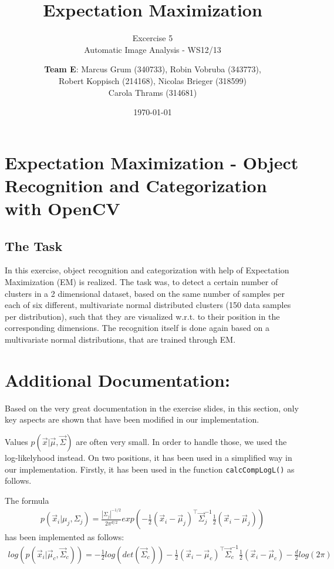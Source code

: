 \documentclass[a4paper,headings=small]{scrartcl}
\title{Expectation Maximization}
\subtitle{Excercise 5 \\ Automatic Image Analysis - WS12/13}
\author{\textbf{Team E}: Marcus Grum (340733), Robin Vobruba (343773), \\ Robert Koppisch (214168), Nicolas Brieger (318599)\\Carola Thrams (314681)}
\date{\today}
\numberwithin{equation}{section} %
\numberwithin{figure}{section}   %
\begin{document}
\maketitle

\section{Expectation Maximization - Object Recognition and Categorization with OpenCV}


\subsection{The Task}
In this exercise, object recognition and categorization
with help of Expectation Maximization (EM) is realized.
The task was, to detect a certain number of clusters in a 2 dimensional dataset,
based on the same number of samples per each of six different,
multivariate normal distributed clusters
(150 data samples per distribution),
such that they are visualized w.r.t. to their position in the corresponding dimensions.
The recognition itself is done again based on a multivariate normal distributions, 
that are trained through EM.

\section{Additional Documentation:}

Based on the very great documentation in the exercise slides,
in this section, only key aspects are shown that have been modified in our implementation.

Values $p( \vec x | \vec \mu, \vec \Sigma)$ are often very small.
In order to handle those, we used the log-likelyhood instead.
On two positions, it has been used in a simplified way in our implementation.
Firstly, it has been used in the function \lstinline!calcCompLogL()!
as follows.

The formula
\begin{align}
p( \vec x_i | \mu_j, \Sigma_j) =
    \frac{|\Sigma_j|^{-1/2}}{2 \pi^{d/2}}
    exp  \left( 
                     - \frac{1}{2} ( \vec x_i - \vec \mu_j )^{\top}
                       \vec \Sigma_j^{-1}
                       \frac{1}{2} ( \vec x_i - \vec \mu_j )
    \right)
\end{align}
has been implemented as follows:
\begin{align}
log \left( p( \vec x_i | \vec \mu_c, \vec \Sigma_c) \right) =
                     - \frac{1}{2} log \left( det(\vec \Sigma_c) \right)
                     - \frac{1}{2} ( \vec x_i - \vec \mu_c )^{\top}
                       \vec \Sigma_c^{-1}
                       \frac{1}{2} ( \vec x_i - \vec \mu_c )
                     - \frac{d}{2} log(2 \pi)
\end{align}
\end{document}
